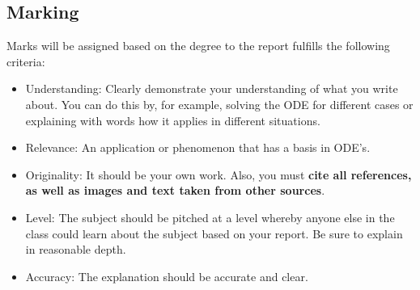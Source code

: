 \subsection{Marking}
Marks will be assigned based on the degree to the report fulfills the following criteria:
\begin{itemize}
    \item Understanding: Clearly demonstrate your understanding of what you write about. You can do this by, for example, solving the ODE for different cases or explaining with words how it applies in different situations.
    \item Relevance: An application or phenomenon that has a basis in ODE's.
    \item Originality: It should be your own work. Also, you must \textbf{cite all references, as well as images and text taken from other sources}.
    \item Level: The subject should be pitched at a level whereby anyone else in the class could learn about the subject based on your report. Be sure to explain in reasonable depth.
    \item Accuracy: The explanation should be accurate and clear.
\end{itemize}

